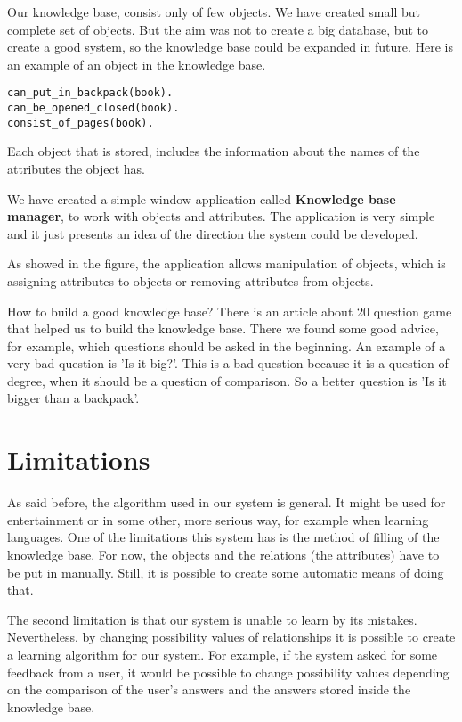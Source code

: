 \documentclass[a4paper]{article}
\begin{document}
Our knowledge base, consist only of few objects. We have created small but complete set of objects. But the aim was not to create a big database, but to create a good system, so the knowledge base could be expanded in future. Here is an example of an object in the knowledge base.
\begin{lstlisting}[caption=Object book.pl,label=lst:objectexample]
can_put_in_backpack(book).
can_be_opened_closed(book).
consist_of_pages(book).
\end{lstlisting}
Each object that is stored, includes the information about the names of the attributes the object has.

We have created a simple window application called \textbf{Knowledge base manager}, to work with objects and attributes. The application is very simple and it just presents an idea of the direction the system could be developed.

    
As showed in the figure, the application allows manipulation of objects, which is assigning attributes to objects or removing attributes from objects.


How to build a good knowledge base? There is an article about 20 question game \citet{howToAskQuestions} that helped us to build the knowledge base. There we found some good advice, for example, which questions should be asked in the beginning. An example of a very bad question is 'Is it big?'. This is a bad question because it is a question of degree, when it should be a question of comparison. So a better question is 'Is it bigger than a backpack'.

\section{Limitations}
As said before, the algorithm used in our system is general. It might be used for entertainment or in some other, more serious way, for example when learning languages. One of the limitations this system has is the method of filling of the knowledge base. For now, the objects and the relations (the attributes) have to be put in manually. Still, it is possible to create some automatic means of doing that.

The second limitation is that our system is unable to learn by its mistakes. Nevertheless, by changing possibility values of relationships it is possible to create a learning algorithm for our system. For example, if the system asked for some feedback from a user, it would be possible to change possibility values depending on the comparison of the user's answers and the answers stored inside the knowledge base. 
\end{document}
